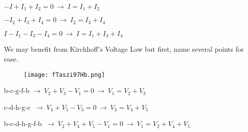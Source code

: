 \documentclass{article}
\begin{document}
\vspace{4mm}

{\Large $-I + I_1 + I_2 = 0 \ \rightarrow \ I = I_1 + I_2 $}

{\Large $-I_2 + I_3 + I_4 = 0 \ \rightarrow \ I_2 = I_3 + I_4 $}

{\Large $I - I_1 - I_3 - I_4 = 0 \ \rightarrow \ I = I_1 + I_3 + I_4 $}

\vspace{4mm}

{\Large We may benefit from Kirchhoff's Voltage Law but first, name several points for ease.}

\begin{figure}[H]
    \centering
    \texttt{[image: fTaszi97Hb.png]}
\end{figure}

{\Large b-c-g-f-b $ \rightarrow \ V_2 + V_3 - V_1 = 0 \ \rightarrow \  V_1 = V_2 + V_3 $}

{\Large c-d-h-g-c $\ \rightarrow \ V_4 + V_5 - V_3 = 0 \ \rightarrow \ V_3 = V_4 + V_5 $}

{\Large b-c-d-h-g-f-b $\ \rightarrow \ V_2 + V_4 + V_5 - V_1 = 0 \ \rightarrow \ V_1 = V_2 + V_4 + V_5 $}

\vspace{4mm}
\end{document}
